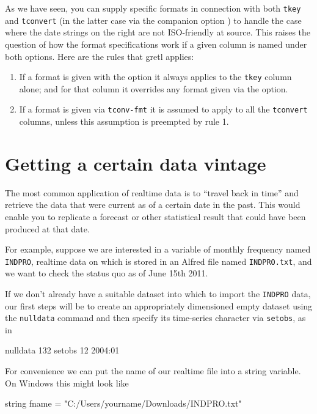 As we have seen, you can supply specific formats in connection with
both \texttt{tkey} and \texttt{tconvert} (in the latter case via the
companion option ) to handle the case where the
date strings on the right are not ISO-friendly at source. This raises
the question of how the format specifications work if a given
column is named under both options.  Here are the rules that gretl
applies:
\begin{enumerate}
\item If a format is given with the  option it always
  applies to the \texttt{tkey} column alone; and for that column it
  overrides any format given via the  option.
\item If a format is given via \texttt{tconv-fmt} it is assumed to
  apply to all the \texttt{tconvert} columns, unless this assumption
  is preempted by rule 1.
\end{enumerate}

\section{Getting a certain data vintage}
\label{sec:realtime-vintage}

The most common application of realtime data is to ``travel back in
time'' and retrieve the data that were current as of a certain date
in the past. This would enable you to replicate a forecast or other
statistical result that could have been produced at that date.

For example, suppose we are interested in a variable of monthly
frequency named \texttt{INDPRO}, realtime data on which is stored in
an Alfred file named \texttt{INDPRO.txt}, and we want to check the
status quo as of June 15th 2011.

If we don't already have a suitable dataset into which to import the
\texttt{INDPRO} data, our first steps will be to create an
appropriately dimensioned empty dataset using the \texttt{nulldata}
command and then specify its time-series character via
\texttt{setobs}, as in
\begin{code}
nulldata 132
setobs 12 2004:01
\end{code}

For convenience we can put the name of our realtime file into a
string variable. On Windows this might look like
\begin{code}
string fname = "C:/Users/yourname/Downloads/INDPRO.txt"
\end{code}

